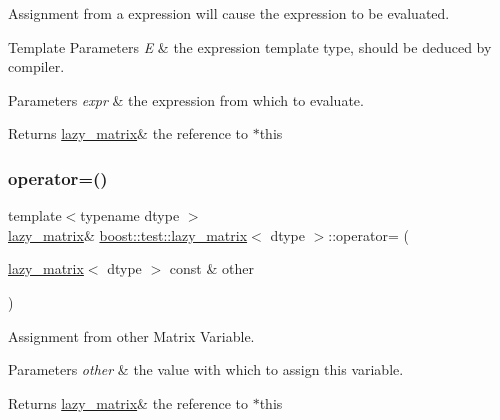 Assignment from a expression will cause the expression to be evaluated. 


\begin{DoxyTemplParams}{Template Parameters}
{\em E} & the expression template type, should be deduced by compiler. \\
\hline
\end{DoxyTemplParams}

\begin{DoxyParams}{Parameters}
{\em expr} & the expression from which to evaluate. \\
\hline
\end{DoxyParams}
\begin{DoxyReturn}{Returns}
\mbox{\hyperlink{classboost_1_1test_1_1lazy__matrix}{lazy\+\_\+matrix}}\& the reference to $\ast$this 
\end{DoxyReturn}
\mbox{\label{classboost_1_1test_1_1lazy__matrix_a2435aa9a75d9edc38619f1c4fb8682f4}} 
\subsubsection{\texorpdfstring{operator=()}{operator=()}\hspace{0.1cm}{\footnotesize\ttfamily [2/2]}}
{\footnotesize\ttfamily template$<$typename dtype $>$ \\
\mbox{\hyperlink{classboost_1_1test_1_1lazy__matrix}{lazy\+\_\+matrix}}\& \mbox{\hyperlink{classboost_1_1test_1_1lazy__matrix}{boost\+::test\+::lazy\+\_\+matrix}}$<$ dtype $>$\+::operator= (\begin{DoxyParamCaption}\item[{\mbox{\hyperlink{classboost_1_1test_1_1lazy__matrix}{lazy\+\_\+matrix}}$<$ dtype $>$ const \&}]{other }\end{DoxyParamCaption})\hspace{0.3cm}{\ttfamily [inline]}}



Assignment from other Matrix Variable. 


\begin{DoxyParams}{Parameters}
{\em other} & the value with which to assign this variable. \\
\hline
\end{DoxyParams}
\begin{DoxyReturn}{Returns}
\mbox{\hyperlink{classboost_1_1test_1_1lazy__matrix}{lazy\+\_\+matrix}}\& the reference to $\ast$this 
\end{DoxyReturn}
\mbox{\label{classboost_1_1test_1_1lazy__matrix_a9767622b9b8397e16333e696e076ac08}} 
